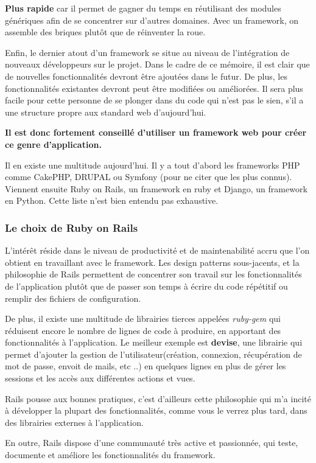 \textbf{Plus rapide} car il permet de gagner du temps en réutilisant des modules génériques afin de se concentrer sur d'autres domaines. Avec un framework, on assemble des briques plutôt que de réinventer la roue. 

Enfin, le dernier atout d'un framework se situe au niveau de l'intégration de nouveaux développeurs sur le projet. Dans le cadre de ce mémoire, il est clair que de nouvelles fonctionnalités devront être ajoutées dans le futur. De plus, les fonctionnalités existantes devront peut être modifiées ou améliorées. Il sera plus facile pour cette personne de se plonger dans du code qui n'est pas le sien, s'il a une structure propre aux standard web d'aujourd'hui.

\textbf{Il est donc fortement conseillé d'utiliser un framework web pour créer ce genre d'application.} 

Il en existe une multitude aujourd'hui. Il y a tout d'abord les frameworks PHP comme CakePHP, DRUPAL ou Symfony (pour ne citer que les plus connus). Viennent ensuite Ruby on Rails, un framework en ruby et Django, un framework en Python. Cette liste n'est bien entendu pas exhaustive. 
\subsubsection{Le choix de Ruby on Rails}
L'intérêt réside dans le niveau de productivité et de maintenabilité accru que l'on obtient en travaillant avec le framework. Les design patterns sous-jacents, et la philosophie de Rails permettent de concentrer son travail sur les fonctionnalités de l'application plutôt que de passer son temps à écrire du code répétitif ou remplir des fichiers de configuration. 

De plus, il existe une multitude de librairies tierces appelées \textit{ruby-gem} qui réduisent encore le nombre de lignes de code à produire, en apportant des fonctionnalités à l'application. Le meilleur exemple est \textbf{devise}, une librairie qui permet d'ajouter la gestion de l'utilisateur(création, connexion, récupération de mot de passe, envoit de mails, etc ..) en quelques lignes en plus de gérer les sessions et les accès aux différentes actions et vues. 

Rails pousse aux bonnes pratiques, c'est d'ailleurs cette philosophie qui m'a incité à développer la plupart des fonctionnalités, comme vous le verrez plus tard, dans des librairies externes à l'application.


En outre, Rails dispose d'une communauté très active et passionnée, qui teste, documente et améliore les fonctionnalités du framework. 

